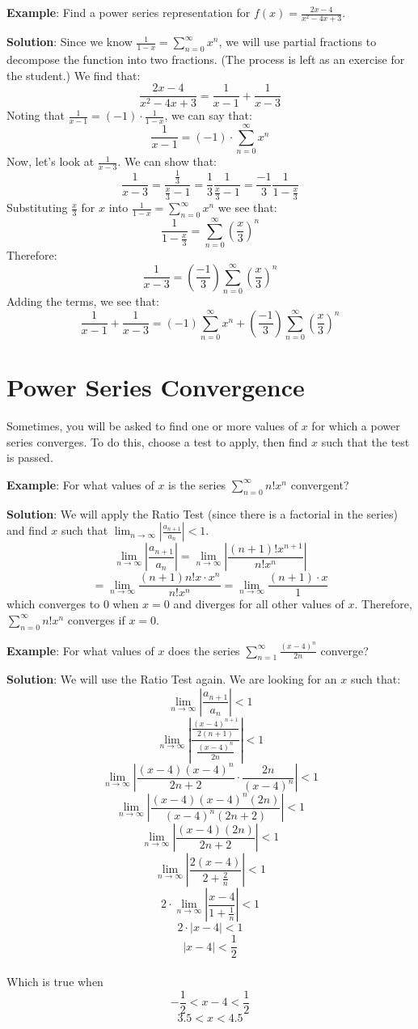 \textbf{Example}: Find a power series representation for $f(x) = \frac{2x - 4}{
x^2 - 4x +3}$. 

\textbf{Solution}: Since we know $\frac{1}{1-x} = \sum_{n=0}^\infty x^n$, we 
will use partial fractions to decompose the function into two fractions. (The 
process is left as an exercise for the student.) We find that:
$$\frac{2x - 4}{x^2 - 4x + 3} = \frac{1}{x - 1} + \frac{1}{x-3}$$
Noting that $\frac{1}{x-1} = (-1) \cdot\frac{1}{1-x}$, we can say that:
$$\frac{1}{x-1} = (-1) \cdot \sum_{n=0}^\infty x^n$$
Now, let's look at $\frac{1}{x-3}$. We can show that:
$$\frac{1}{x-3} = \frac{\frac{1}{3}}{\frac{x}{3}-1} = \frac{1}{3} \frac{1}{
\frac{x}{3}-1} = \frac{-1}{3} \frac{1}{1-\frac{x}{3}}$$
Substituting $\frac{x}{3}$ for $x$ into $\frac{1}{1-x} = \sum_{n=0}^\infty 
x^n$ we see that:
$$\frac{1}{1-\frac{x}{3}} = \sum_{n=0}^\infty \left(\frac{x}{3} \right)^n$$
Therefore:
$$\frac{1}{x-3} = \left( \frac{-1}{3} \right) \sum_{n=0}^\infty \left( 
\frac{x}{3} \right)^n$$
Adding the terms, we see that:
$$\frac{1}{x-1} + \frac{1}{x-3} = (-1) \sum_{n=0}^\infty x^n + \left( 
\frac{-1}{3} \right) \sum_{n=0}^\infty \left( \frac{x}{3} \right)^n$$

\section{Power Series Convergence}
Sometimes, you will be asked to find one or more values of $x$ 
for which a power series converges. To do this, choose a test to apply, 
then find $x$ such that the test is passed. 

\textbf{Example}: For what values of $x$ is the series $\sum_{n=0}^\infty n!x^n$ 
convergent?

\textbf{Solution}: We will apply the Ratio Test (since there is a factorial in 
the series) and find $x$ such that $\lim_{n \to \infty} \left| \frac{a_{n+1}}{
a_n} \right| < 1$. 
$$\lim_{n \to \infty} \left| \frac{a_{n + 1}}{a_n} \right| = \lim_{n \to 
\infty} \left| \frac{(n+1)!x^{n+1}}{n!x^n} \right|$$
$$= \lim_{n \to \infty} \frac{(n+1) n! x \cdot x^n}{n!x^n} = \lim_{n \to 
\infty} \frac{(n+1) \cdot x}{1}$$
which converges to $0$ when $x=0$ and diverges for all other values of $x$. 
Therefore, $\sum_{n=0}^\infty n!x^n$ converges if $x=0$. 

\textbf{Example}: For what values of $x$ does the series $\sum_{n=1}^\infty 
\frac{(x-4)^n}{2n}$ converge?

\textbf{Solution}: We will use the Ratio Test again. We are looking for an $x$ 
such that:
$$\lim_{n \to \infty} \left| \frac{a_{n+1}}{a_n} \right| < 1$$
$$\lim_{n \to \infty} \left| \frac{\frac{(x-4)^{n+1}}{2(n+1)}}{\frac{(x-4)^n}{
2n}} \right| < 1$$
$$\lim_{n \to \infty} \left| \frac{(x-4)(x-4)^n}{2n + 2} \cdot \frac{2n}{(x-4)^
n} \right| < 1$$
$$\lim_{n \to \infty} \left| \frac{(x-4)(x-4)^n(2n)}{(x-4)^n(2n+2)} \right| < 
1$$
$$\lim_{n \to \infty} \left| \frac{(x-4)(2n)}{2n + 2} \right| < 1$$
$$\lim_{n \to \infty} \left| \frac{2(x-4)}{2 + \frac{2}{n}} \right| < 1$$
$$2 \cdot \lim_{n \to \infty} \left| \frac{x-4}{1+ \frac{1}{n}} \right| < 1$$
$$2 \cdot \left| x-4 \right| < 1$$
$$\left| x-4 \right| < \frac{1}{2}$$\\
Which is true when 
$$-\frac{1}{2} < x-4 < \frac{1}{2}$$
$$3.5 < x < 4.5$$

